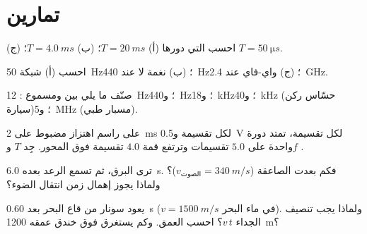 \section{تمارين}

\begin{exercise}[$\star$]\label{exo:g10:signals-and-waves:1}
احسب   التي دورها
(أ) $T = \qty{20}{ms}$؛ (ب) $T = \qty{4.0}{ms}$؛
(ج) $T = \qty{50}{\micro s}$.
\end{exercise}

\begin{exercise}[$\star$]\label{exo:g10:signals-and-waves:2}
احسب  (أ) شبكة \qty{50}{Hz}؛ (ب) نغمة لا عند \qty{440}{Hz}؛
(ج)  واي-فاي عند \qty{2.4}{GHz}.
\end{exercise}

\begin{exercise}[$\star$]\label{exo:g10:signals-and-waves:3}
صنّف ما يلي بين  ومسموع : \qty{12}{Hz}؛
و\qty{440}{Hz}؛ و\qty{18}{kHz}؛ و\qty{40}{kHz} (حسّاس ركن سيارة)؛
و\qty{5}{MHz} (مسبار طبي).
\end{exercise}

\begin{exercise}[$\star$]\label{exo:g10:signals-and-waves:4}
على راسم اهتزاز مضبوط على \qty{2}{ms} لكل تقسيمة و\qty{0.5}{V} لكل
تقسيمة، تمتد دورة واحدة على $5.0$ تقسيمات وترتفع قمة $4.0$
تقسيمة فوق المحور. جِد $T$ و$f$ .
\end{exercise}

\begin{exercise}[$\star$]\label{exo:g10:signals-and-waves:5}
ترى البرق، ثم تسمع الرعد بعده \qty{6.0}{s}. فكم بعدت
الصاعقة ($v_{\text{الصوت}} = \qty{340}{m/s}$)؟ ولماذا يجوز إهمال
زمن انتقال الضوء؟
\end{exercise}

\begin{exercise}[$\star\star$]\label{exo:g10:signals-and-waves:6}
يعود  سونار من قاع البحر بعد \qty{0.60}{s}
($v = \qty{1500}{m/s}$ في ماء البحر). ولماذا يجب تنصيف الجداء $v\,t$؟
احسب العمق. وكم يستغرق  فوق خندق عمقه
\qty{1200}{m}؟
\end{exercise}


